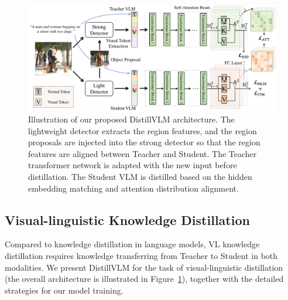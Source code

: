 \begin{figure}[th!]
    \centering
    \includegraphics[width=.98\textwidth]{images/distillvlm_architecture.pdf} 
    \caption[Illustration of our proposed DistillV{\footnotesize L}M architecture.]{ 
    {
    Illustration of our proposed DistillV{\footnotesize L}M architecture. The lightweight detector extracts the region features, and the region proposals are injected into the strong detector so that the region features are aligned between Teacher and Student. The Teacher transformer network is adapted with the new input before distillation. The Student VLM is distilled based on the hidden embedding matching and attention distribution alignment. 
    }
    }
    \label{fig:arch}
\end{figure}

\subsection{Visual-linguistic Knowledge Distillation}
Compared to knowledge distillation in language models, VL knowledge distillation requires knowledge transferring from Teacher to Student in both modalities.
We present {DistillV{\small L}M} for the task of visual-linguistic distillation (the overall architecture is illustrated in Figure~\ref{fig:arch}), together with the detailed strategies for our model training. 

